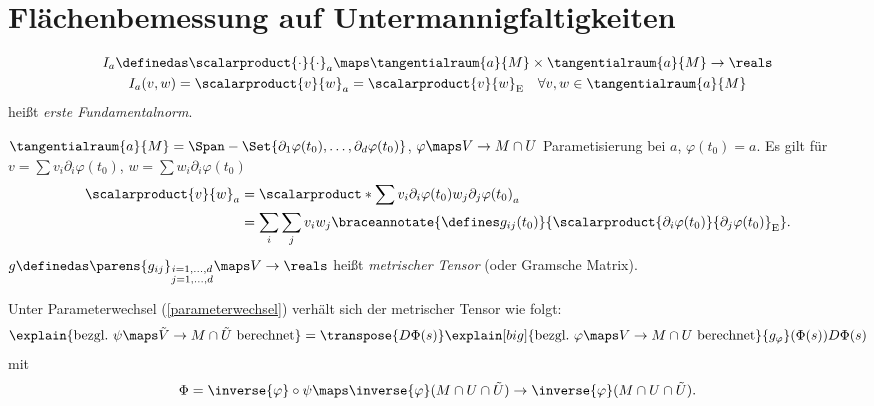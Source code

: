 \section{Flächenbemessung auf Untermannigfaltigkeiten}
\begin{definition*}
  \begin{gather*}
    I_a\definedas \scalarproduct{\cdot}{\cdot}_a\maps \tangentialraum{a}{M}\times\tangentialraum{a}{M}\to \reals\\
    I_a(v,w)=\scalarproduct{v}{w}_{a}=\scalarproduct{v}{w}_{\text{E}}\quad \forall v,w\in \tangentialraum{a}{M}
  \end{gather*}
  heißt \emph{erste Fundamentalnorm}.
\end{definition*}
\begin{bemerkung*}
  \( \tangentialraum{a}{M}=\Span-{\Set{\partial_1 \varphi(t_0),\dotsc,\partial_d \varphi(t_0)}} \), \( \varphi\maps V\to M\cap U \) Parametisierung bei \( a \), \( \varphi(t_0)=a \). Es gilt für \( v=\sum v_i \partial_i \varphi(t_0) \), \( w=\sum w_i \partial_i \varphi(t_0) \)
  \begin{align*}
    \scalarproduct{v}{w}_{a}&=\scalarproduct*{\sum v_i \partial_i \varphi(t_0)}{w_j \partial_j \varphi(t_0)}_{a}\\
    &=\sum_{i}\sum_j v_i w_j \braceannotate{\defines g_{ij}(t_0)}{\scalarproduct{\partial_i \varphi(t_0)}{\partial_j \varphi(t_0)}_{\text{E}}}.
  \end{align*}
  \( g\definedas \parens{g_{ij}}_{\substack{i=1,\dotsc,d\\ j=1,\dotsc,d}}\maps V\to \reals \) heißt \emph{metrischer Tensor} (oder Gramsche Matrix).
\end{bemerkung*}
\begin{lemma}\label{parameterwechsel_metrischer_tensor}
   Unter Parameterwechsel (\vgl \ref{parameterwechsel}) verhält sich der metrischer Tensor wie folgt:
   \begin{equation*}
     \explain{\text{bezgl.\ \( \psi\maps \tilde{V}\to M\cap \tilde{U} \) berechnet}}=\transpose{D\Phi(s)}\explain[big]{\text{bezgl.\ \( \varphi\maps V\to M\cap U \) berechnet}}{g_{\varphi}}(\Phi(s))D\Phi(s)
   \end{equation*}
   mit
   \begin{equation*}
    \Phi=\inverse{\varphi}\circ \psi\maps  \inverse{\varphi}(M\cap U\cap \tilde{U})\to \inverse{\varphi}(M\cap U\cap \tilde{U}).
   \end{equation*}
\end{lemma}
